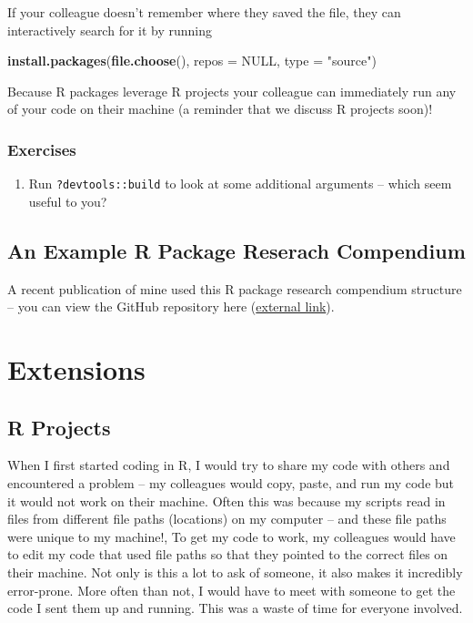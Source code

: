 \documentclass[
]{book}
\newenvironment{Shaded}{\begin{snugshade}}{\end{snugshade}}
\newcommand{\DataTypeTok}[1]{\textcolor[rgb]{0.13,0.29,0.53}{#1}}
\newcommand{\KeywordTok}[1]{\textcolor[rgb]{0.13,0.29,0.53}{\textbf{#1}}}
\newcommand{\NormalTok}[1]{#1}
\newcommand{\OtherTok}[1]{\textcolor[rgb]{0.56,0.35,0.01}{#1}}
\newcommand{\StringTok}[1]{\textcolor[rgb]{0.31,0.60,0.02}{#1}}
\providecommand{\tightlist}{%
  \setlength{\itemsep}{0pt}\setlength{\parskip}{0pt}}
\begin{document}
If your colleague doesn't remember where they saved the file, they can interactively search for it by running

\begin{Shaded}
\begin{Highlighting}[]
\KeywordTok{install.packages}\NormalTok{(}\KeywordTok{file.choose}\NormalTok{(), }\DataTypeTok{repos =} \OtherTok{NULL}\NormalTok{, }\DataTypeTok{type =} \StringTok{"source"}\NormalTok{)}
\end{Highlighting}
\end{Shaded}

Because R packages leverage R projects your colleague can immediately run any of your code on their machine (a reminder that we discuss R projects soon)!

\hypertarget{ex-set10}{%
\subsection{Exercises}\label{ex-set10}}

\begin{enumerate}
\def\labelenumi{\arabic{enumi}.}
\tightlist
\item
  Run \texttt{?devtools::build} to look at some additional arguments -- which seem useful to you?
\end{enumerate}

\hypertarget{ex-rc}{%
\section{An Example R Package Reserach Compendium}\label{ex-rc}}

A recent publication of mine used this R package research compendium structure -- you can view the GitHub repository here (\href{https://github.com/michaeldumelle/DumelleEtAl2021STLMM}{external link}).

\hypertarget{extensions}{%
\chapter{Extensions}\label{extensions}}

\hypertarget{r-projects}{%
\section{R Projects}\label{r-projects}}

When I first started coding in R, I would try to share my code with others and encountered a problem -- my colleagues would copy, paste, and run my code but it would not work on their machine. Often this was because my scripts read in files from different file paths (locations) on my computer -- and these file paths were unique to my machine!, To get my code to work, my colleagues would have to edit my code that used file paths so that they pointed to the correct files on their machine. Not only is this a lot to ask of someone, it also makes it incredibly error-prone. More often than not, I would have to meet with someone to get the code I sent them up and running. This was a waste of time for everyone involved.
\end{document}
